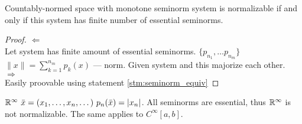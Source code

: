 \begin{thm}
  Countably-normed space with monotone seminorm system is normalizable if and
  only if this system has finite number of essential seminorms.
\end{thm}

\begin{proof}
  $\Leftarrow$ \\
  Let system has finite amount of essential seminorms. 
  $\{p_{n_1}, \dotsc p_{n_m}\}$ \\
  $\|x\| = \sum\limits_{k = 1}^{n_m}p_k(x)$ --- norm. Given system and this
  majorize each other. \\
  $\Rightarrow$ \\
  Easily proovable using statement \ref{stm:seminorm_equiv}
\end{proof}

\begin{ex}
  $\mathbb{R}^\infty\ \bar{x} = (x_1, \dotsc, x_n, \dotsc)\ p_n(\bar{x}) = |x_n|$. All
  seminorms are essential, thus $\mathbb{R}^\infty$ is not normalizable. The same
  applies to $C^\infty[a, b]$.
\end{ex}
